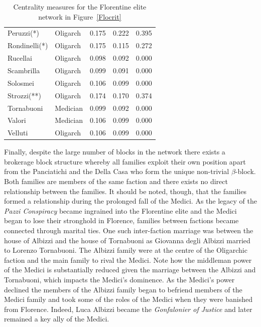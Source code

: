 \begin{table}[H]
\begin{center}
\begin{tabular}{llccc}
Peruzzi(*)  		& Oligarch 			& 0.175 		& 0.222 		& 0.395	\\
Rondinelli(*) 		& Oligarch 			& 0.175 		& 0.115 		& 0.272	\\
Rucellai     		& Oligarch 			& 0.098 		& 0.092 		& 0.000	\\
Scambrilla 			& Oligarch 			& 0.099 		& 0.091 		& 0.000	\\
Solosmei    		& Oligarch 			& 0.106 		& 0.099 		& 0.000	\\
Strozzi(**) 		& Oligarch 			& 0.174 		& 0.170 		& 0.374	\\
Tornabuoni   		& Medician 			& 0.099 		& 0.092 		& 0.000	\\
Valori     			& Medician 			& 0.106 		& 0.099 		& 0.000	\\
Velluti     		& Oligarch 			& 0.106 		& 0.099 		& 0.000	\\
\bottomrule
\end{tabular}
\end{center}
\caption{Centrality measures for the Florentine elite network in Figure~\ref{Flocrit}}
\label{table:florentineElite}
\end{table}

Finally, despite the large number of blocks in the network there exists a brokerage block structure whereby all families exploit their own position apart from the Panciatichi and the Della Casa who form the unique non-trivial $\beta$-block. Both families are members of the same faction and there exists no direct relationship between the families. It should be noted, though, that the families formed a relationship during the prolonged fall of the Medici. As the legacy of the \textit{Pazzi Conspiracy} became ingrained into the Florentine elite and the Medici began to lose their stronghold in Florence, families between factions became connected through marital ties. One such inter-faction marriage was between the house of Albizzi and the house of Tornabuoni as Giovanna degli Albizzi married to Lorenzo Tornabuoni. The Albizzi family were at the centre of the Oligarchic faction and the main family to rival the Medici. Note how the middleman power of the Medici is substantially reduced given the marriage between the Albizzi and Tornabuoni, which impacts the Medici's dominence. As the Medici's power declined the members of the Albizzi family began to befriend members of the Medici family and took some of the roles of the Medici when they were banished from Florence. Indeed, Luca Albizzi became the \textit{Gonfalonier of Justice} and later remained a key ally of the Medici.

